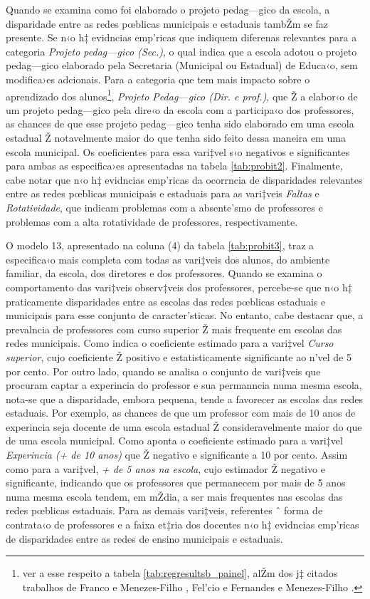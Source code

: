 \documentclass[a4paper, 12pt]{article}
\begin{document}
Quando se examina como foi elaborado o projeto pedag—gico da escola, a disparidade entre as redes pœblicas municipais e estaduais tambŽm se faz presente. Se n‹o h‡ evidncias emp’ricas que indiquem diferenas relevantes para a categoria \emph{Projeto pedag—gico (Sec.)}, o qual indica que a escola adotou o projeto pedag—gico elaborado pela Secretaria (Municipal ou Estadual) de Educa‹o, sem modifica›es adcionais. Para a categoria que tem mais impacto sobre o aprendizado dos alunos\footnote{ver a esse respeito a tabela \ref{tab:regresultsb_painel}, alŽm dos j‡ citados trabalhos de Franco e Menezes-Filho \citeyear{franco_determinantes_2009}, Fel’cio e Fernandes \citeyear{felicio_efeito_2005} e Menezes-Filho \citeyear{menezes_determinantes_2007}.}, \emph{Projeto Pedag—gico (Dir. e prof.)}, que Ž a elabor‹o de um projeto pedag—gico pela dire‹o da escola com a participa‹o dos professores, as chances de que esse projeto pedag—gico tenha sido elaborado em uma escola estadual Ž notavelmente maior do que tenha sido feito dessa maneira em uma escola municipal. Os coeficientes para essa vari‡vel s‹o negativos e significantes para ambas as especifica›es apresentadas na tabela \ref{tab:probit2}. Finalmente, cabe notar que n‹o h‡ evidncias emp’ricas da ocorrncia de disparidades relevantes entre as redes pœblicas municipais e estaduais para as vari‡veis \emph{Faltas} e \emph{Rotatividade}, que indicam problemas com a absente’smo de professores e problemas com a alta rotatividade de professores, respectivamente.

O modelo 13, apresentado na coluna (4) da tabela \ref{tab:probit3}, traz a especifica‹o mais completa com todas as vari‡veis dos alunos, do ambiente familiar, da escola, dos diretores e dos professores. Quando se examina o comportamento das vari‡veis observ‡veis dos professores, percebe-se que n‹o h‡ praticamente disparidades entre as escolas das redes pœblicas estaduais e municipais para esse conjunto de caracter’sticas. No entanto, cabe destacar que, a prevalncia de professores com curso superior Ž mais frequente em escolas das redes municipais. Como indica o coeficiente estimado para a vari‡vel \emph{Curso superior}, cujo coeficiente Ž positivo e estatisticamente significante ao n’vel de 5 por cento. Por outro lado, quando se analisa o conjunto de vari‡veis que procuram captar a experincia do professor e sua permanncia numa mesma escola, nota-se que a disparidade, embora pequena, tende a favorecer as escolas das redes estaduais. Por exemplo, as chances de que um professor com mais de 10 anos de experincia seja docente de uma escola estadual Ž consideravelmente maior do que de uma escola municipal. Como aponta o coeficiente estimado para a vari‡vel \emph{Experincia (+ de 10 anos)} que Ž negativo e significante a  10 por cento. Assim como para a vari‡vel, \emph{+ de 5 anos na escola}, cujo estimador Ž negativo e significante, indicando que os professores que permanecem por mais de 5 anos numa mesma escola tendem, em mŽdia, a ser mais frequentes nas escolas das redes pœblicas estaduais. Para as demais vari‡veis, referentes ˆ forma de contrata‹o de professores e a faixa et‡ria dos docentes n‹o h‡ evidncias emp’ricas de disparidades entre as redes de ensino municipais e estaduais.
\end{document}
